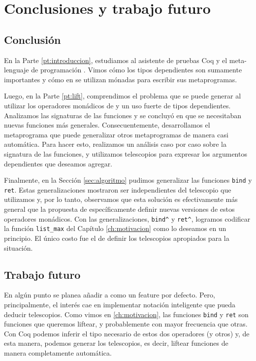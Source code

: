 \chapter{Conclusiones y trabajo futuro}\label{ch:conclusion}

\section{Conclusión}\label{sc:conclusion}

En la Parte \ref{pt:introduccion}, estudiamos al asistente de pruebas Coq y el meta-lenguaje de programación \mtac. Vimos cómo los tipos dependientes son sumamente importantes y cómo en \mtac se utilizan mónadas para escribir sus metaprogramas.

Luego, en la Parte \ref{pt:lift}, comprendimos el problema que se puede generar al utilizar los operadores monádicos de \mtac y un uso fuerte de tipos dependientes. Analizamos las signaturas de las funciones y se concluyó en que se necesitaban nuevas funciones más generales.
Consecuentemente, desarrollamos el metaprograma \lift que puede generalizar otros metaprogramas de manera casi automática. Para hacer esto, realizamos un análisis caso por caso sobre la signatura de las funciones, y utilizamos telescopios para expresar los argumentos dependientes que deseamos agregar.

Finalmente, en la Sección \ref{sec:algoritmo} pudimos generalizar las funciones \lstinline{bind} y \lstinline{ret}.
Estas generalizaciones mostraron ser independientes del telescopio que utilizamos y, por lo tanto, observamos que esta solución es efectivamente más general que la propuesta de específicamente definir nuevas versiones de estos operadores monádicos.
Con las generalizaciones, \lstinline{bind^} y \lstinline{ret^}, logramos codificar la función \lstinline{list_max} del Capítulo \ref{ch:motivacion} como lo deseamos en un principio.
El único costo fue el de definir los telescopios apropiados para la situación.

\section{Trabajo futuro}\label{sc:futuro}

En algún punto se planea añadir \lift a \mtac como un feature por defecto.
Pero, principalmente, el interés cae en implementar notación inteligente que pueda deducir telescopios.
Como vimos en \ref{ch:motivacion}, las funciones \lstinline{bind} y \lstinline{ret} son funciones que queremos liftear, y probablemente con mayor frecuencia que otras.
Con Coq podemos inferir el tipo necesario de estos dos operadores (y otros) y, de esta manera, podemos generar los telescopios, es decir, liftear funciones de manera completamente automática.

